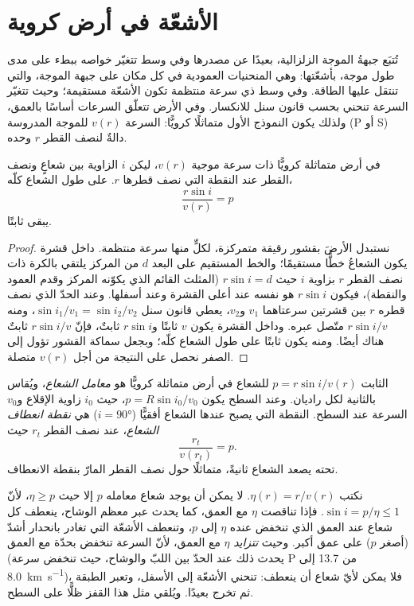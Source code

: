 \section{الأشعّة في أرض كروية}

تُتبَع جبهةُ الموجة الزلزالية، بعيدًا عن مصدرها وفي وسط تتغيّر خواصه
ببطء على مدى طول موجة، بأشعّتها: وهي المنحنيات
العمودية في كل مكان على جبهة الموجة، والتي تنتقل عليها الطاقة. وفي وسط
ذي سرعة منتظمة تكون الأشعّة مستقيمة؛ وحيث تتغيّر السرعة تنحني
بحسب قانون سنل للانكسار. وفي الأرض تتعلّق السرعات أساسًا بالعمق،
ولذلك يكون النموذج الأول متماثلًا كرويًّا: السرعة $v(r)$ للموجة
المدروسة (P أو S) دالةٌ لنصف القطر $r$ وحده.

\begin{theorem}\label{thm:b3:seismology-imaging:snell}
في أرض متماثلة كرويًّا ذات سرعة موجية $v(r)$، ليكن $i$ الزاوية
بين شعاعٍ ونصف القطر عند النقطة التي نصف قطرها $r$. على طول الشعاع كلّه،
\[
  \frac{r\sin i}{v(r)} = p
\]
يبقى ثابتًا.
\end{theorem}

\begin{proof}
نستبدل الأرضَ بقشور رقيقة متمركزة، لكلٍّ منها سرعة منتظمة. داخل قشرة
يكون الشعاعُ خطًّا مستقيمًا؛ والخط المستقيم على البعد $d$ من
المركز يلتقي بالكرة ذات نصف القطر $r$ بزاوية $i$ حيث
$r\sin i = d$ (المثلث القائم الذي يكوّنه المركز وقدم العمود
والنقطة)، فيكون $r\sin i$ هو نفسه عند أعلى القشرة وعند أسفلها. وعند الحدّ
الذي نصف قطره $r$ بين قشرتين سرعتاهما
$v_1$ و$v_2$، يعطي قانون سنل $\sin i_1/v_1 = \sin i_2/v_2$، ومنه
$r\sin i/v$ متّصل عبره. وداخل القشرة يكون $v$ ثابتًا
و$r\sin i$ ثابتٌ، فإنّ $r\sin i/v$ ثابتٌ هناك أيضًا. ومنه يكون
ثابتًا على طول الشعاع كلّه؛ وبجعل سماكة القشور تؤول إلى
الصفر نحصل على النتيجة من أجل $v(r)$ متصلة.
\end{proof}

\begin{definition}\label{def:b3:seismology-imaging:ray-parameter}
الثابت $p = r\sin i/v(r)$ للشعاع في أرض متماثلة كرويًّا هو
\emph{معامل الشعاع}، ويُقاس بالثانية لكل راديان. وعند
السطح يكون $p = R\sin i_0/v_0$، حيث $i_0$ زاوية الإقلاع و$v_0$
السرعة عند السطح. النقطة التي يصبح عندها الشعاع أفقيًّا ($i = \ang{90}$)
هي \emph{نقطة انعطاف الشعاع}،
عند نصف القطر $r_t$ حيث
\[
  \frac{r_t}{v(r_t)} = p .
\]
تحته يصعد الشعاع ثانيةً، متماثلًا حول نصف القطر المارّ بنقطة
الانعطاف.
\end{definition}

نكتب $\eta(r) = r/v(r)$. لا يمكن أن يوجد شعاع معامله $p$ إلا حيث
$\eta \ge p$، لأنّ $\sin i = p/\eta \le 1$. فإذا تناقصت $\eta$ مع العمق، كما
يحدث عبر معظم الوشاح، ينعطف كل شعاع عند العمق الذي تنخفض عنده $\eta$
إلى $p$، وتنعطف الأشعّة التي تغادر بانحدار أشدّ (أصغر $p$) على عمق أكبر.
وحيث \emph{تتزايد} $\eta$ مع العمق، لأنّ السرعة تنخفض بحدّة مع
العمق (يحدث ذلك عند الحدّ بين اللبّ والوشاح، حيث تنخفض سرعة P من
13.7 إلى \qty{8.0}{km.s^{-1}})، %
فلا يمكن لأيّ شعاع أن ينعطف: تنحني الأشعّة إلى الأسفل، وتعبر الطبقة ثم تخرج بعيدًا.
ويُلقي مثل هذا القفز ظلًّا على السطح.

